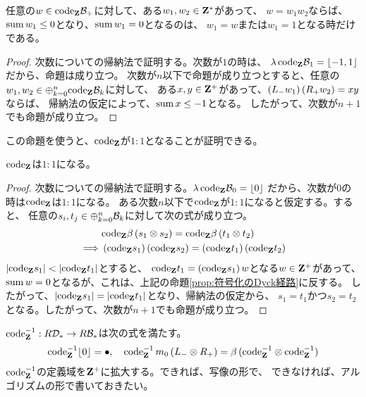 {	\begin{proposition}[符号化のDyck経路]\label{prop:符号化のDyck経路} %
		任意の$w\in\code_\sei\clB_+$に対して、ある$w_1,w_2\in\sei^*$があって、
		$w=w_1w_2$ならば、$\sumw\,w_1\le 0$となり、$\sumw\,w_1=0$となるのは、
		$w_1=w$または$w_1=1$となる時だけである。
	\EOP\end{proposition} %
	\begin{proof} %
		次数についての帰納法で証明する。次数が$1$の時は、
		$\lambda\,\code_\sei\clB_1=\word{-1,1}$だから、命題は成り立つ。
		次数が$n$以下で命題が成り立つとすると、任意の
		$w_1,w_2\in\oplus_{k=0}^n\code_\sei\clB_k$に対して、
		ある$x,y\in\sei^+$があって、$\plr{L_-w_1}\plr{R_+w_2}=xy$ならば、
		帰納法の仮定によって、$\sumw\,x\le-1$となる。
		したがって、次数が$n+1$でも命題が成り立つ。
	\end{proof} %

	この命題を使うと、$\code_\sei$が$1:1$となることが証明できる。

	\begin{proposition}[符号化は$1:1$]\label{prop:符号化は1:1} %
		$\code_\sei$は$1:1$になる。
	\end{proposition} %
	\begin{proof} %
		次数についての帰納法で証明する。$\lambda\,\code_\sei\clB_0=\word{0}$
		だから、次数が$0$の時は$\code_\sei$は$1:1$になる。
		ある次数$n$以下で$\code_\sei$が$1:1$になると仮定する。すると、
		任意の$s_i,t_j\in\oplus_{k=0}^n\clB_k$に対して次の式が成り立つ。
		\begin{equation*}\begin{split}
			&\code_\sei\beta\plr{s_1\otimes s_2}
			= \code_\sei\beta\plr{t_1\otimes t_2} \\
			\implies& \plr{\code_\sei s_1}\plr{\code_\sei s_2}
			= \plr{\code_\sei t_1}\plr{\code_\sei t_2}
		\end{split}\end{equation*}
		$|\code_\sei s_1|<|\code_\sei t_1|$とすると、
		$\code_\sei t_1=\plr{\code_\sei s_1}w$となる$w\in\sei^+$があって、
		$\sumw\,w=0$となるが、これは、上記の命題\ref{prop:符号化のDyck経路}に反する。
		したがって、$|\code_\sei s_1|=|\code_\sei t_1|$となり、帰納法の仮定から、
		$s_1=t_1$かつ$s_2=t_2$となる。したがって、次数が$n+1$でも命題が成り立つ。
	\end{proof} %

	\begin{todo}[復号化]\label{todo:復号化} %
		$\code_\sei^{-1}:R\clD_*\to R\clB_*$は次の式を満たす。
		\begin{equation*}\begin{split}
			\code_\sei^{-1}\word{0} = \bullet,\quad
			\code_\sei^{-1}\,m_0\plr{L_-\otimes R_+} 
			= \beta\plr{\code_\sei^{-1}\otimes\code_\sei^{-1}}
		\end{split}\end{equation*}
		$\code_\sei^{-1}$の定義域を$\sei^+$に拡大する。できれば、写像の形で、
		できなければ、アルゴリズムの形で書いておきたい。\EOP
	\end{todo} %

}
